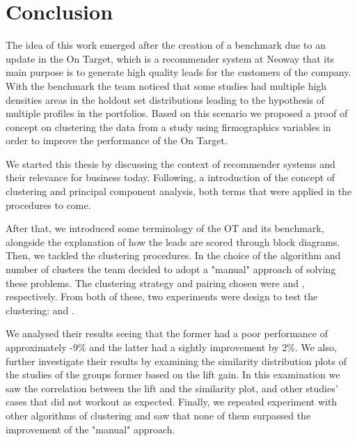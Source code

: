 \chapter{Conclusion} 
\label{cha:conclusion}

The idea of this work emerged after the creation of a benchmark due to an update in the On Target, which is a recommender system at Neoway that its main purpose is to generate high quality leads for the customers of the company. With the benchmark the team noticed that some studies had multiple high densities areas in the holdout set distributions leading to the hypothesis of multiple profiles in the portfolios. Based on this scenario we proposed a proof of concept on clustering the data from a study using firmographics variables in order to improve the performance of the On Target.

We started this thesis by discussing the context of recommender systems and their relevance for business today. Following, a introduction of the concept of clustering and principal component analysis, both terms that were applied in the procedures to come.

After that, we introduced some terminology of the OT and its benchmark, alongside the explanation of how the leads are scored through block diagrams. Then, we tackled the clustering procedures. In the choice of the algorithm and number of clusters the team decided to adopt a "manual" approach of solving these problems. The clustering strategy and pairing chosen were \nameClusterStrategyA{} and \nameClusterPairingA{}, respectively. From both of these, two experiments were design to test the clustering: \nameExperimentI{} and \nameExperimentII{}.

We analysed their results seeing that the former had a poor performance of approximately -9\% and the latter had a sightly improvement by 2\%. We also, further investigate their results by examining the similarity distribution plots of the studies of the groups former based on the lift gain. In this examination we saw the correlation between the lift and the similarity plot, and other studies' cases that did not workout as expected. Finally, we repeated experiment \nameExperimentII{} with other algorithms of clustering and saw that none of them surpassed the improvement of the "manual" approach.

